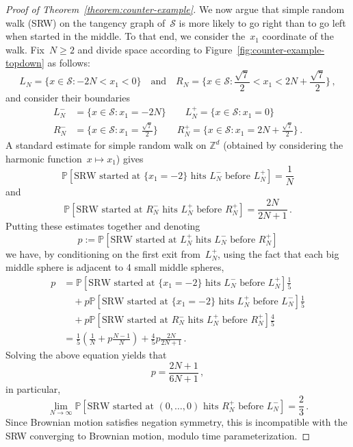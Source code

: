 \documentclass[12pt]{amsart}
\numberwithin{equation}{section}
\renewcommand*{\P}{\mathbb P}
\newcommand*{\Zd}{\ensuremath{\mathbb{Z}^d}}
\begin{document}
\begin{proof}[Proof of Theorem~\ref{theorem:counter-example}]
	We now argue that simple random walk (SRW) on the tangency graph of~$\mathcal{S}$ is more likely to go right than to go left when started in the middle. To that end, we consider the~$x_1$ coordinate of the walk. Fix~$N \geq 2$ and divide space
	according to Figure~\ref{fig:counter-example-topdown} as follows:
	\begin{equation}
		\label{eq:def-of-ln}
		L_N = \{ x \in \mathcal{S} : -2 N < x_1  < 0 \} \quad \mbox{and} \quad R_N =  \{ x \in \mathcal{S}: \frac{\sqrt{7}}{2} < x_1 < 2N + \frac{\sqrt{7}}{2} \} \,  , 
	\end{equation}
	and consider their boundaries 
	\begin{equation}
		\label{eq:def-of-lnp}
		\begin{aligned}
			L_N^{-} &= \{ x \in \mathcal{S}: x_1 = -2N \} \qquad L_N^{+} = \{ x \in \mathcal{S}: x_1 = 0 \} \\
			R_N^{-} &= \{ x \in \mathcal{S}: x_1 = \frac{\sqrt{7}}{2}  \} \qquad R_N^{+} = \{ x \in \mathcal{S}: x_1 = 2N + \frac{\sqrt{7}}{2} \} \, .
		\end{aligned}
	\end{equation}
	A standard estimate for simple random walk on $\Zd$ (obtained by considering the harmonic function~$x \mapsto x_1$) gives 
	\[
	\P\left[ \mbox{SRW started at~$\{x_1 = -2\}$ hits~$L_N^{-}$ before~$L_N^+$}\right] = \frac{1}{N}
	\]
	and
	\[
	\P\left[ \mbox{SRW started at~$R_N^{-}$ hits~$L_N^{+}$ before~$R_N^+$}\right] = \frac{2N}{2N+1} \, . 
	\]
	Putting these estimates together and denoting 
	\[
	p := \P[\mbox{SRW started at~$L_N^+$ hits~$L_N^{-}$ before~$R_N^+$}]
	\]
	we have, by conditioning on the first exit from~$L_N^+$, using the fact that each big middle sphere is adjacent to 4 small middle spheres,
	\begin{align*}
		p &=  \P\left[ \mbox{SRW started at~$\{x_1 = -2\}$ hits~$L_N^{-}$ before~$L_N^+$}\right] \frac{1}{5}  \\
		&\quad+ p \P\left[ \mbox{SRW started at~$\{x_1 = -2\}$ hits~$L_N^{+}$ before~$L_N^{-}$}\right] \frac{1}{5} \\
		&\quad+  p \P\left[ \mbox{SRW started at~$R_N^{-}$ hits~$L_N^{+}$ before~$R_N^+$}\right] \frac{4}{5} \\
		&=  \frac{1}{5}\left( \frac{1}{N} + p \frac{N-1}{N}\right) + \frac{4}{5} p \frac{2N}{2 N +1}  \, . 
	\end{align*}
	Solving the above equation yields that 
	\[
	p = \frac{2N+ 1}{6N + 1} \, , 
	\]
	in particular, 
	\[
	\lim_{N \to \infty} \P[\mbox{SRW started at~$(0,\ldots,0)$ hits~$R_N^{+}$ before~$L_N^{-}$}]  = \frac{2}{3} \, .  
	\]
	Since Brownian motion satisfies negation symmetry, this is incompatible with the SRW converging to Brownian motion, modulo time parameterization.  
\end{proof}




{
  
  
}
\end{document}
